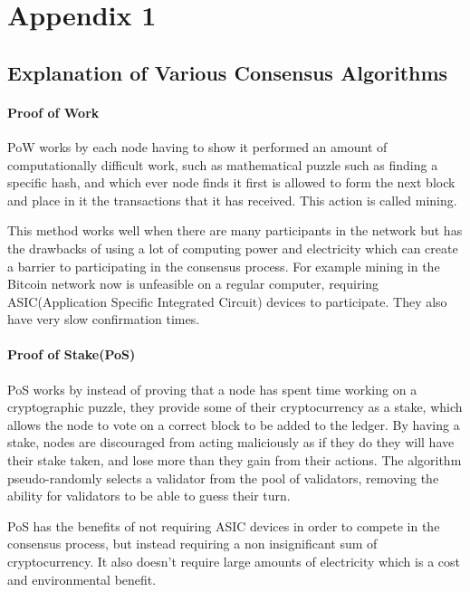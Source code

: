 \chapter{Appendix 1}\label{app1}


\section{Explanation of Various Consensus Algorithms}

\subsubsection{Proof of Work}
PoW works by each node having to show it performed an amount of computationally difficult work, such as mathematical puzzle such as finding a specific hash, and which ever node finds it first is allowed to form the next block and place in it the transactions that it has received. This action is called mining.\cite{nakamoto2012bitcoin}

This method works well when there are many participants in the network but has the drawbacks of using a lot of computing power and electricity which can create a barrier to participating in the consensus process. For example mining in the Bitcoin network now is unfeasible on a regular computer, requiring ASIC(Application Specific Integrated Circuit) devices to participate. They also have very slow confirmation times.\cite{Baliga2017UnderstandingBC} 

\subsubsection{Proof of Stake(PoS)}
PoS works by instead of proving that a node has spent time working on a cryptographic puzzle, they provide some of their cryptocurrency as a stake, which allows the node to vote on a correct block to be added to the ledger. By having a stake, nodes are discouraged from acting maliciously as if they do they will have their stake taken, and lose more than they gain from their actions. The algorithm pseudo-randomly selects a validator from the pool of validators, removing the ability for validators to be able to guess their turn.\cite{buterin2014ethereum}

PoS has the benefits of not requiring ASIC devices in order to compete in the consensus process, but instead requiring a non insignificant sum of cryptocurrency. It also doesn't require large amounts of electricity which is a cost and environmental benefit. 

